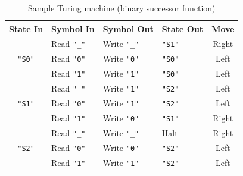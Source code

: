 \documentclass[11pt]{article}
\def\t#1{\texttt{#1}}
\begin{document}
\begin{table}[h]
  \centering
  \begin{tabular}{cl|llc}
    \textbf{State In} & \textbf{Symbol In} & \textbf{Symbol Out} & \textbf{State Out} & \textbf{Move} \\ \hline
                   & Read \t{"\_"} & Write \t{"\_"} & \t{"S1"} & Right \\
    \t{"S0"}       & Read \t{"0"}  & Write \t{"0"}  & \t{"S0"} & Left  \\
                   & Read \t{"1"}  & Write \t{"1"}  & \t{"S0"} & Left  \\ \cline{1-5}
                   & Read \t{"\_"} & Write \t{"1"}  & \t{"S2"} & Left  \\
    \t{"S1"}       & Read \t{"0"}  & Write \t{"1"}  & \t{"S2"} & Left  \\
                   & Read \t{"1"}  & Write \t{"0"}  & \t{"S1"} & Right \\ \cline{1-5}
                   & Read \t{"\_"} & Write \t{"\_"} & Halt     & Right \\ 
    \t{"S2"}       & Read \t{"0"}  & Write \t{"0"}  & \t{"S2"} & Left  \\
                   & Read \t{"1"}  & Write \t{"1"}  & \t{"S2"} & Left  
  \end{tabular}
  \caption{Sample Turing machine (binary successor function)}
  \label{tab:tm}
\end{table}
\end{document}
